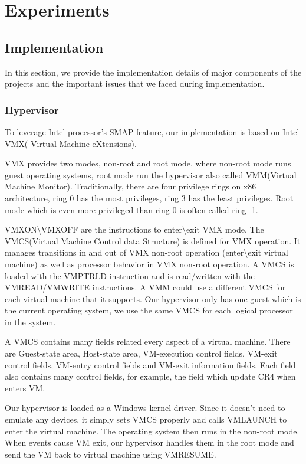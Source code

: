 \section{Experiments}

\subsection{Implementation}
\label{sec:implementation}

In this section, we provide the implementation details of major components of the projects and the important issues that we faced during implementation.

\subsubsection{Hypervisor}

To leverage Intel processor's SMAP feature, our implementation is based on Intel VMX( Virtual Machine eXtensions).

VMX provides two modes, non-root and root mode, where non-root mode runs guest operating systems, root mode run the hypervisor also called VMM(Virtual Machine Monitor). Traditionally, there are four privilege rings on x86 architecture, ring 0 has the most privileges, ring 3 has the least privileges. Root mode which is even more privileged than ring 0 is often called ring -1.


VMXON\textbackslash{}VMXOFF are the instructions to enter\textbackslash{}exit VMX mode. The VMCS(Virtual Machine Control data Structure) is defined for VMX operation. It manages transitions in and out of VMX non-root operation (enter\textbackslash{}exit virtual machine) as well as processor behavior in VMX non-root operation. A VMCS is loaded with the VMPTRLD instruction and is read/written with the VMREAD/VMWRITE instructions. A VMM could use a different VMCS for each virtual machine that it supports. Our hypervisor only has one guest which is the current operating system, we use the same VMCS for each logical processor in the system. 

A VMCS contains many fields related every aspect of a virtual machine. There are Guest-state area, Host-state area, VM-execution control fields, VM-exit control fields, VM-entry control fields and VM-exit information fields. Each field also contains many control fields, for example, the field which update CR4 when enters VM.

Our hypervisor is loaded as a Windows kernel driver. Since it doesn't need to emulate any devices, it simply sets VMCS properly and calls VMLAUNCH to enter the virtual machine. The operating system then runs in the non-root mode. When events cause VM exit, our hypervisor handles them in the root mode and send the VM back to virtual machine using VMRESUME. 

